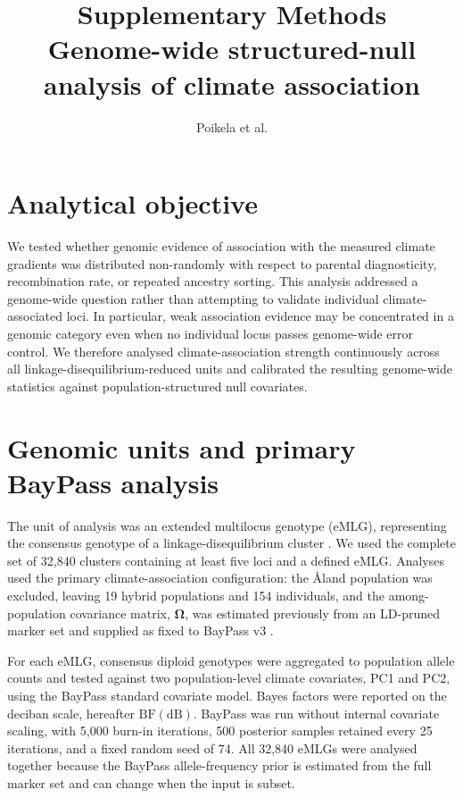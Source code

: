 \documentclass[11pt,a4paper]{article}
\title{Supplementary Methods\\Genome-wide structured-null analysis of climate association}
\author{Poikela et al.}
\date{}
\begin{document}
\maketitle

\section{Analytical objective}

We tested whether genomic evidence of association with the measured climate gradients was distributed non-randomly with respect to parental diagnosticity, recombination rate, or repeated ancestry sorting. This analysis addressed a genome-wide question rather than attempting to validate individual climate-associated loci. In particular, weak association evidence may be concentrated in a genomic category even when no individual locus passes genome-wide error control. We therefore analysed climate-association strength continuously across all linkage-disequilibrium-reduced units and calibrated the resulting genome-wide statistics against population-structured null covariates.

\section{Genomic units and primary BayPass analysis}

The unit of analysis was an extended multilocus genotype (eMLG), representing the consensus genotype of a linkage-disequilibrium cluster \citep{Li2018}. We used the complete set of 32,840 clusters containing at least five loci and a defined eMLG. Analyses used the primary climate-association configuration: the \AA{}land population was excluded, leaving 19 hybrid populations and 154 individuals, and the among-population covariance matrix, $\boldsymbol{\Omega}$, was estimated previously from an LD-pruned marker set and supplied as fixed to BayPass v3 \citep{Gautier2015}.

For each eMLG, consensus diploid genotypes were aggregated to population allele counts and tested against two population-level climate covariates, PC1 and PC2, using the BayPass standard covariate model. Bayes factors were reported on the deciban scale, hereafter $\mathrm{BF(dB)}$. BayPass was run without internal covariate scaling, with 5,000 burn-in iterations, 500 posterior samples retained every 25 iterations, and a fixed random seed of 74. All 32,840 eMLGs were analysed together because the BayPass allele-frequency prior is estimated from the full marker set and can change when the input is subset.
\end{document}
